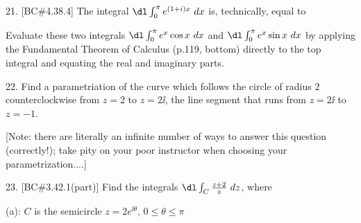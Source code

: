



\loadmsbm

\dl{\displaystyle}
\ctln{\centerline}
\ssk{\smallskip}
\msk{\medskip}
\bsk{\bigskip}
\ubr{\underbar}

\overfullrule=0pt
\nopagenumbers



\msk


\bsk

\bsk

\item{21.} [BC\#4.38.4] The integral $\dl \int_0^\pi e^{(1+i)x}\ dx$ is, technically, equal to

\msk


\msk

\item{} Evaluate these two integrals 
$\dl \int_0^\pi e^{x}\cos x\ dx$ and $\dl\int_0^\pi e^{x}\sin x\ dx$ by 
applying the Fundamental Theorem of Calculus (p.119, bottom) directly to the top
integral and equating the real and imaginary parts.

\bsk

\item{22.} Find a parametriation of the curve which follows the circle of radius
$2$ counterclockwise from $z=2$ to $z=2\ii$,   the line segment
that runs from $z=2\ii$ to $z=-1$.

\msk

\item{} [Note: there are literally an infinite number of ways to answer this question (correctly!);
take pity on your poor instructor when choosing your parametrization....]
 
\bsk

\item{23.} [BC\#3.42.1(part)] Find the integrals $\dl \int_C{{z+2}\over{z}}\ dz$, 
where

\msk

\item{} (a): $C$ is the semicircle $z=2e^{\ii\theta}$, $0\leq \theta\leq \pi$

